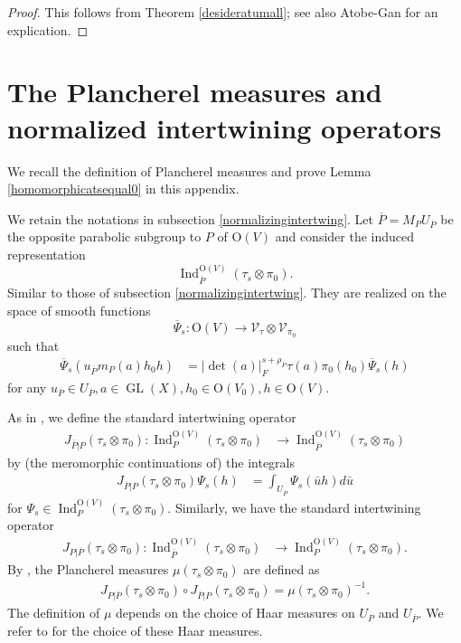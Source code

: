 \documentclass[article]{article}
\numberwithin{equation}{section}
\theoremstyle{definition}
\DeclareMathOperator{\Ind}{Ind}
\DeclareMathOperator{\GL}{GL}
\begin{document}
\begin{proof}
	This follows from Theorem \ref{desideratumall}; see also Atobe-Gan \cite[\S 3.5]{MR3708200} for an explication. 
\end{proof}



\section{The Plancherel measures and normalized intertwining operators}\label{plancherelmeasure}
We recall the definition of Plancherel measures and prove Lemma \ref{homomorphicatsequal0} in this appendix. 
 
We retain the notations in subsection \ref{normalizingintertwing}. Let $\overline{P}=M_{P} U_{\overline P}$ be the opposite parabolic subgroup to $P$ of $\mathrm O(V)$ and consider the induced representation
$$\Ind_{\overline{P}}^{\mathrm O\left(V\right)}\left(\tau_{s} \otimes \pi_0 \right).$$ 
Similar to those of subsection \ref{normalizingintertwing}. They are realized on the space of smooth functions 
$$\overline{\Psi}_{s} : \mathrm O(V) \rightarrow \mathscr{V}_{\tau} \otimes \mathscr{V}_{\pi_0}$$
such that
\begin{align*} \overline{\Psi}_{s}\left( u_{\overline P} m_{P}(a) h_0 h\right) &=|\det(a)|_{F}^{s+\rho_{\overline P}} \tau(a) \pi_0(h_0)  \overline{\Psi}_{s}\left(h\right) 
\end{align*}
for any $ u_{\overline P} \in U_{\overline P}, a\in \GL(X), h_0\in \mathrm{O}(V_0), h \in \mathrm{O}(V)$.

As in \cite[\S 12]{MR3166215}, we define the 
standard intertwining operator
\begin{align*}
J_{\overline{P}|P}(\tau_{s}\otimes \pi_0): \Ind_{P}^{\mathrm O(V)}(\tau_{s}\otimes \pi_0) &\longrightarrow \Ind_{\overline{P}}^{\mathrm O(V)}(\tau_{s}\otimes \pi_0)
\end{align*}
by (the meromorphic continuations of) the integrals
\begin{align*}
J_{\overline{P}|P}(\tau_{s}\otimes \pi_0)\Psi_s(h)&= \int_{U_{\overline P}} \Psi_s(\bar uh)d\bar u 
\end{align*}
for $\Psi_s\in \Ind_{P}^{\mathrm O(V)}(\tau_{s}\otimes \pi_0)$. Similarly, we have the 
standard intertwining operator
\begin{align*}
J_{P|\overline P}(\tau_{s}\otimes \pi_0): \Ind_{\overline P}^{\mathrm O(V)}(\tau_{s}\otimes \pi_0) &\longrightarrow \Ind_{P}^{\mathrm O(V)}(\tau_{s}\otimes \pi_0). 
\end{align*}
By \cite[\S 12]{MR3166215}, the Plancherel measures $\mu(\tau_{s}\otimes\pi_0)$ are defined as 
\begin{align*}\label{planch}
J_{P|\overline{P}}(\tau_{s}\otimes \pi_0)\circ J_{\overline{P}|P}(\tau_{s}\otimes \pi_0)= \mu(\tau_{s}\otimes\pi_0)^{-1}. 
\end{align*}
The definition of $\mu$ depends on the choice of Haar measures on $U_P$ and $U_{\overline P}$. We refer to \cite[Appendix B]{MR3166215} for the choice of these Haar measures. 
\end{document}
